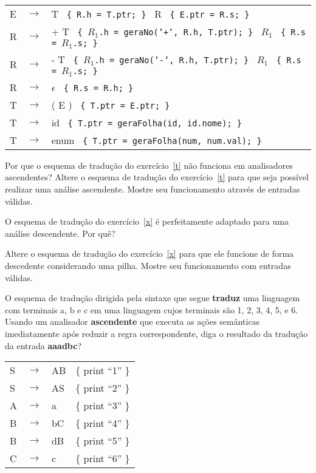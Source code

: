 \documentclass{compiladores}
\begin{document}
\begin{listanumerada}
\begin{tabular}{lll}
 E  &  $\rightarrow$  &  T \texttt{ \{ R.h = T.ptr; \} } R \texttt{ \{ E.ptr = R.s; \} }                                \\
 R  &  $\rightarrow$  &  + T \texttt{ \{ $R_1$.h = geraNo('+', R.h, T.ptr); \} } $R_1$ \texttt{ \{ R.s = $R_1$.s; \} }  \\
 R  &  $\rightarrow$  &  - T \texttt{ \{ $R_1$.h = geraNo('-', R.h, T.ptr); \} } $R_1$ \texttt{ \{ R.s = $R_1$.s; \} }  \\
 R  &  $\rightarrow$  &  $\epsilon$ \texttt{ \{ R.s = R.h; \} }                                                         \\
 T  &  $\rightarrow$  &  ( E ) \texttt{ \{ T.ptr = E.ptr; \} }                                                          \\
 T  &  $\rightarrow$  &  id \texttt{ \{ T.ptr = geraFolha(id, id.nome); \} }                                            \\
 T  &  $\rightarrow$  &  enum \texttt{ \{ T.ptr = geraFolha(num, num.val); \} }                                         \\
\end{tabular}

\item Por que o esquema de tradução do exercício~\ref{t} não funciona
  em analisadores ascendentes? Altere o esquema de tradução do
  exercício~\ref{t} para que seja possível realizar uma análise
  ascendente. Mostre seu funcionamento através de entradas válidas.

\item O esquema de tradução do exercício~\ref{x} é perfeitamente
  adaptado para uma análise descendente. Por quê?

\item Altere o esquema de tradução do exercício~\ref{x} para que ele
  funcione de forma descedente considerando uma pilha. Mostre seu
  funcionamento com entradas válidas.

\item O esquema de tradução dirigida pela sintaxe que segue \textbf{traduz}
     uma linguagem com terminais a, b e c em uma linguagem cujos
     terminais são 1, 2, 3, 4, 5, e 6. Usando um analisador \textbf{ascendente}
     que executa as ações semânticas imediatamente após reduzir a
     regra correspondente, diga o resultado da tradução da entrada
     \textbf{aaadbc}?

     \begin{tabular}{llll}
       S  &  $\rightarrow$  &  AB  &  \{ print ``1'' \}  \\
       S  &  $\rightarrow$  &  AS  &  \{ print ``2'' \}  \\
       A  &  $\rightarrow$  &  a   &  \{ print ``3'' \}  \\
       B  &  $\rightarrow$  &  bC  &  \{ print ``4'' \}  \\
       B  &  $\rightarrow$  &  dB  &  \{ print ``5'' \}  \\
       C  &  $\rightarrow$  &  c   &  \{ print ``6'' \}  \\
     \end{tabular}


\end{listanumerada}
\end{document}
